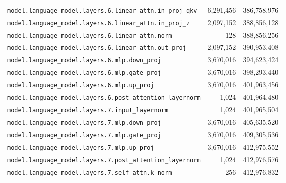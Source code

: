 \documentclass[10pt,a4paper]{article}
\theoremstyle{definition}
\begin{document}
\begin{appendices}
\begin{longtable}{p{9.5cm}rr}
\texttt{model.\allowbreak{}language\_model.\allowbreak{}layers.\allowbreak{}6.\allowbreak{}linear\_attn.\allowbreak{}in\_proj\_qkv} & 6,291,456 & 386,758,976 \\
\texttt{model.\allowbreak{}language\_model.\allowbreak{}layers.\allowbreak{}6.\allowbreak{}linear\_attn.\allowbreak{}in\_proj\_z} & 2,097,152 & 388,856,128 \\
\texttt{model.\allowbreak{}language\_model.\allowbreak{}layers.\allowbreak{}6.\allowbreak{}linear\_attn.\allowbreak{}norm} & 128 & 388,856,256 \\
\texttt{model.\allowbreak{}language\_model.\allowbreak{}layers.\allowbreak{}6.\allowbreak{}linear\_attn.\allowbreak{}out\_proj} & 2,097,152 & 390,953,408 \\
\texttt{model.\allowbreak{}language\_model.\allowbreak{}layers.\allowbreak{}6.\allowbreak{}mlp.\allowbreak{}down\_proj} & 3,670,016 & 394,623,424 \\
\texttt{model.\allowbreak{}language\_model.\allowbreak{}layers.\allowbreak{}6.\allowbreak{}mlp.\allowbreak{}gate\_proj} & 3,670,016 & 398,293,440 \\
\texttt{model.\allowbreak{}language\_model.\allowbreak{}layers.\allowbreak{}6.\allowbreak{}mlp.\allowbreak{}up\_proj} & 3,670,016 & 401,963,456 \\
\texttt{model.\allowbreak{}language\_model.\allowbreak{}layers.\allowbreak{}6.\allowbreak{}post\_attention\_layernorm} & 1,024 & 401,964,480 \\
\texttt{model.\allowbreak{}language\_model.\allowbreak{}layers.\allowbreak{}7.\allowbreak{}input\_layernorm} & 1,024 & 401,965,504 \\
\texttt{model.\allowbreak{}language\_model.\allowbreak{}layers.\allowbreak{}7.\allowbreak{}mlp.\allowbreak{}down\_proj} & 3,670,016 & 405,635,520 \\
\texttt{model.\allowbreak{}language\_model.\allowbreak{}layers.\allowbreak{}7.\allowbreak{}mlp.\allowbreak{}gate\_proj} & 3,670,016 & 409,305,536 \\
\texttt{model.\allowbreak{}language\_model.\allowbreak{}layers.\allowbreak{}7.\allowbreak{}mlp.\allowbreak{}up\_proj} & 3,670,016 & 412,975,552 \\
\texttt{model.\allowbreak{}language\_model.\allowbreak{}layers.\allowbreak{}7.\allowbreak{}post\_attention\_layernorm} & 1,024 & 412,976,576 \\
\texttt{model.\allowbreak{}language\_model.\allowbreak{}layers.\allowbreak{}7.\allowbreak{}self\_attn.\allowbreak{}k\_norm} & 256 & 412,976,832 \\

\end{longtable}
\end{appendices}
\end{document}
